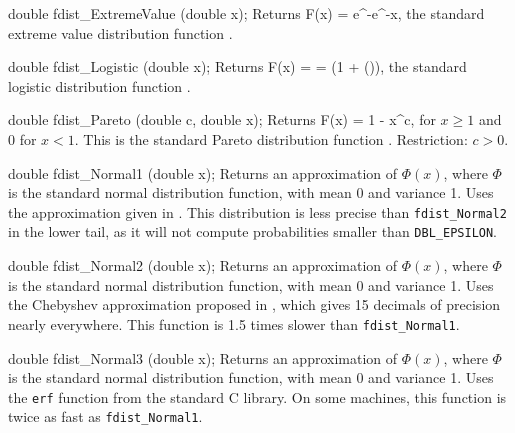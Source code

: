 double fdist_ExtremeValue (double x);
\endcode
 \tab
  Returns 
 \eq
     F(x) = e^{-e^{-x}},                       
 \endeq
  the standard extreme value distribution function \cite{tJOH95b}.
 \endtab
\code


double fdist_Logistic (double x);
\endcode
 \tab
  Returns 
  \eq F(x) =  =
       \left(1 + \tanh \left(\right)\right),
  \endeq
  the standard logistic distribution function \cite{tJOH95b}.
 \endtab
\code


double fdist_Pareto (double c, double x);
\endcode
  \tab
  Returns
  \eq
     F(x) = 1 -  {x^c},
  \endeq
  for $x\ge 1$ and 0 for $x<1$.  This is
  the standard Pareto distribution function \cite{tJOH95a}.
  Restriction: $c > 0$.
 \endtab
\code


double fdist_Normal1 (double x);
\endcode
  \tab  
  Returns an approximation of $\Phi(x)$, where $\Phi$ is the standard normal
  distribution function, with mean 0 and variance 1. 
  Uses the approximation given in \cite[page 90]{tKEN80a}. This distribution
  is less precise than {\tt fdist\_Normal2} in the lower tail, as it will
  not compute probabilities smaller than {\tt DBL\_EPSILON}.
 \endtab
\code


double fdist_Normal2 (double x);
\endcode
  \tab  
  Returns an approximation of $\Phi(x)$, 
  where $\Phi$ is the standard normal distribution function,
  with mean 0 and variance 1. 
  Uses the Chebyshev approximation proposed in \cite{tSCH78a},
  which gives 15 decimals of precision nearly everywhere.
  This function is 1.5 times slower than {\tt fdist\_Normal1}.
 \endtab
\code


double fdist_Normal3 (double x);
\endcode
  \tab
  Returns an approximation of $\Phi(x)$, 
  where $\Phi$ is the standard normal distribution function,
  with mean 0 and variance 1. 
  Uses the {\tt erf} function from the standard C library. On some machines,
  this function is twice as fast as {\tt fdist\_Normal1}.
 \endtab
\code


